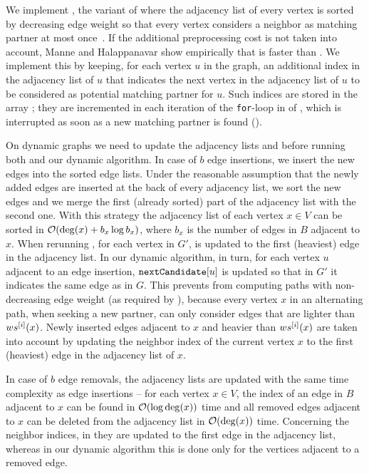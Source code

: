 We implement \ssuitor, \ie the variant of \suitor where the adjacency list of
every vertex is sorted by decreasing edge weight so that every vertex considers
a neighbor as matching partner at most once~\cite{DBLP:conf/ipps/ManneH14}. If
the additional preprocessing cost is not taken into account, Manne and
Halappanavar show empirically that \ssuitor is faster than \suitor. We
implement this by keeping, for each vertex $u$ in the graph, an additional
index in the adjacency list of $u$ that indicates the next vertex in the
adjacency list of $u$ to be considered as potential matching partner for $u$.
Such indices are stored in the array \nextCand; they are incremented in each
iteration of the \texttt{for}-loop in  of
, which is interrupted as soon as a new
matching partner is found ().

On dynamic graphs we need to update the adjacency lists and \nextCand before
running both \ssuitor and our dynamic algorithm. In case of $b$ edge
insertions, we insert the new edges into the sorted edge lists. Under the
reasonable assumption that the newly added edges are inserted at the back of
every adjacency list, we sort the new edges and we merge the first (already
sorted) part of the adjacency list with the second one. With this strategy the
adjacency list of each vertex $x\in V$ can be sorted in $\mathcal{O}(\deg(x) +
b_x\log b_x)$, where $b_x$ is the number of edges in $B$ adjacent
to $x$. When rerunning \ssuitor, for each vertex in $G'$, \nextCand is updated
to the first (\ie heaviest) edge in the adjacency list. In our dynamic
algorithm, in turn, for each vertex $u$ adjacent to an edge insertion,
$\texttt{nextCandidate}[u]$ is updated so that in $G'$ it indicates the same edge as in $G$.
This prevents \findaffb from computing paths with non-decreasing edge weight
(as required by ), because every vertex $x$ in
an alternating path, when seeking a new partner, can only consider edges that
are lighter than $ws^{[i]}(x)$. Newly inserted edges adjacent to $x$ and
heavier than $ws^{[i]}(x)$ are taken into account by updating the neighbor
index of the current vertex $x$ to the first (\ie heaviest) edge in the
adjacency list of $x$.

In case of $b$ edge removals, the adjacency lists are updated with the same
time complexity as edge insertions -- for each vertex $x \in V$, the index of
an edge in $B$ adjacent to $x$ can be found in $\mathcal{O}(\log\deg(x))$ time and all
removed edges adjacent to $x$ can be deleted from the adjacency list in
$\mathcal{O}(\deg(x))$ time. Concerning the neighbor indices, in \ssuitor they are
updated to the first edge in the adjacency list, whereas in our dynamic
algorithm this is done only for the vertices adjacent to a removed edge.

